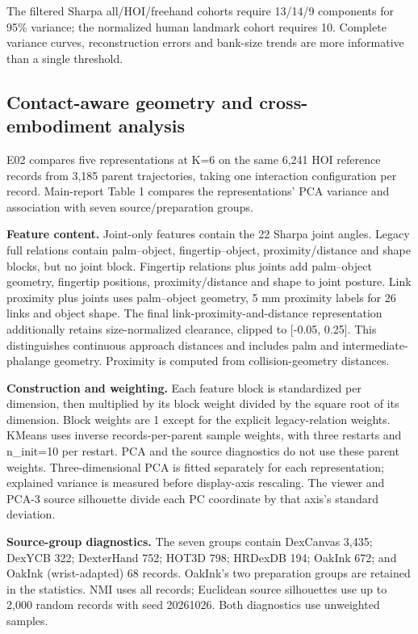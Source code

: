 \documentclass[10pt,twocolumn]{article}
\begin{document}
The filtered Sharpa all/HOI/freehand cohorts require 13/14/9 components for 95\% variance; the normalized human landmark cohort requires 10. Complete variance curves, reconstruction errors and bank-size trends are more informative than a single threshold.

\subsection{Contact-aware geometry and cross-embodiment analysis}

E02 compares five representations at K=6 on the same 6,241 HOI reference records from 3,185 parent trajectories, taking one interaction configuration per record. Main-report Table 1 compares the representations' PCA variance and association with seven source/preparation groups.

\textbf{Feature content.} Joint-only features contain the 22 Sharpa joint angles. Legacy full relations contain palm--object, fingertip--object, proximity/distance and shape blocks, but no joint block. Fingertip relations plus joints add palm--object geometry, fingertip positions, proximity/distance and shape to joint posture. Link proximity plus joints uses palm--object geometry, 5 mm proximity labels for 26 links and object shape. The final link-proximity-and-distance representation additionally retains size-normalized clearance, clipped to [-0.05, 0.25]. This distinguishes continuous approach distances and includes palm and intermediate-phalange geometry. Proximity is computed from collision-geometry distances.

\textbf{Construction and weighting.} Each feature block is standardized per dimension, then multiplied by its block weight divided by the square root of its dimension. Block weights are 1 except for the explicit legacy-relation weights. KMeans uses inverse records-per-parent sample weights, with three restarts and n\_init=10 per restart. PCA and the source diagnostics do not use these parent weights. Three-dimensional PCA is fitted separately for each representation; explained variance is measured before display-axis rescaling. The viewer and PCA-3 source silhouette divide each PC coordinate by that axis's standard deviation.

\textbf{Source-group diagnostics.} The seven groups contain DexCanvas 3,435; DexYCB 322; DexterHand 752; HOT3D 798; HRDexDB 194; OakInk 672; and OakInk (wrist-adapted) 68 records. OakInk's two preparation groups are retained in the statistics. NMI uses all records; Euclidean source silhouettes use up to 2,000 random records with seed 20261026. Both diagnostics use unweighted samples.
\end{document}
